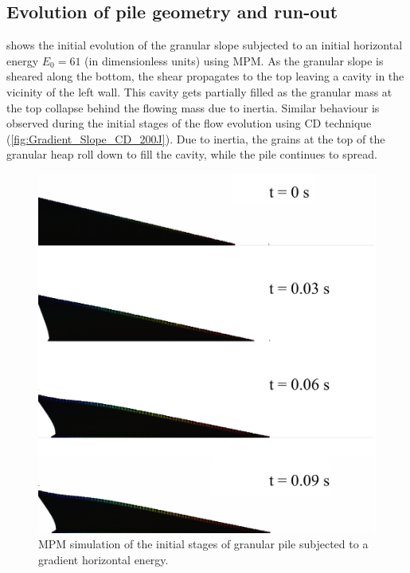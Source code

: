 \documentclass[3p,times,procedia,number]{elsarticle}
\begin{document}
\subsection{Evolution of pile geometry and run-out}
\label{sec:evolution}

 shows the initial evolution of the 
granular slope subjected to an initial horizontal energy $E_0 = 61$ (in 
dimensionless units) using MPM. As the granular slope is sheared along the 
bottom, the shear propagates to the top leaving a cavity in the vicinity of the 
left wall. This cavity gets partially filled as the granular mass at the top 
collapse behind the flowing mass due to inertia. Similar behaviour is observed 
during the initial stages of the flow evolution using CD technique 
(\cref{fig:Gradient_Slope_CD_200J}). Due to inertia, the grains at the top 
of the granular heap roll down to fill the cavity, while the pile continues to 
spread. 

\begin{figure}[tbph]
  \centering
  \includegraphics[width=\textwidth]{figs/Gradient_Slope_Profile_200J}
  \caption{MPM simulation of the initial stages of granular pile subjected to a 
  gradient horizontal energy.}
  \label{fig:Gradient_Slope_Profile_200J}
\end{figure}
\end{document}
